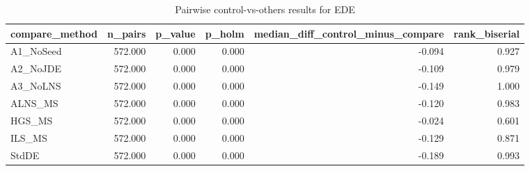 \begin{table}[!t]
\centering
\caption{Pairwise control-vs-others results for EDE}
\label{tab:posthoc_holm_generated}
\begin{tabular}{lrrrrr}
\toprule
compare_method & n_pairs & p_value & p_holm & median_diff_control_minus_compare & rank_biserial \\
\midrule
A1_NoSeed & 572.000 & 0.000 & 0.000 & -0.094 & 0.927 \\
A2_NoJDE & 572.000 & 0.000 & 0.000 & -0.109 & 0.979 \\
A3_NoLNS & 572.000 & 0.000 & 0.000 & -0.149 & 1.000 \\
ALNS_MS & 572.000 & 0.000 & 0.000 & -0.120 & 0.983 \\
HGS_MS & 572.000 & 0.000 & 0.000 & -0.024 & 0.601 \\
ILS_MS & 572.000 & 0.000 & 0.000 & -0.129 & 0.871 \\
StdDE & 572.000 & 0.000 & 0.000 & -0.189 & 0.993 \\
\bottomrule
\end{tabular}

\end{table}